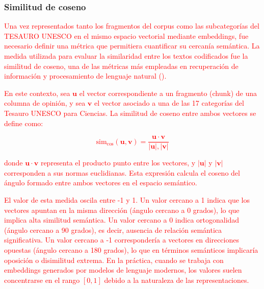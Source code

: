 \documentclass[11pt,a4paper]{article}
\begin{document}
%	
%	
%	
	
	\subsubsection{Similitud de coseno}
	
	\textcolor{red}{Una vez representados tanto los fragmentos del corpus como las subcategorías del TESAURO UNESCO en el mismo espacio vectorial mediante embeddings, fue necesario definir una métrica que permitiera cuantificar su cercanía semántica. La medida utilizada para evaluar la similaridad entre los textos codificados fue la similitud de coseno, una de las métricas más empleadas en recuperación de información y procesamiento de lenguaje natural (\cite{Jurafsky2025}).}
		
		\textcolor{red}{En este contexto, sea $\mathbf{u}$ el vector correspondiente a un fragmento (chunk) de una columna de opinión, y sea $\mathbf{v}$ el vector asociado a una de las 17 categorías del Tesauro UNESCO para Ciencias. La similitud de coseno entre ambos vectores se define como:}
		
	\textcolor{red}{	\begin{equation}
			\text{sim}_{\cos}(\mathbf{u}, \mathbf{v}) =
			\frac{\mathbf{u} \cdot \mathbf{v}}
			{|\mathbf{u}| , |\mathbf{v}|}
		\end{equation}}
		
		\textcolor{red}{donde $\mathbf{u} \cdot \mathbf{v}$ representa el producto punto entre los vectores, y $|\mathbf{u}|$ y $|\mathbf{v}|$ corresponden a sus normas euclidianas. Esta expresión calcula el coseno del ángulo formado entre ambos vectores en el espacio semántico.}
		
		\textcolor{red}{El valor de esta medida oscila entre -1 y 1. Un valor cercano a 1 indica que los vectores apuntan en la misma dirección (ángulo cercano a 0 grados), lo que implica alta similitud semántica. Un valor cercano a 0 indica ortogonalidad (ángulo cercano a 90 grados), es decir, ausencia de relación semántica significativa. Un valor cercano a -1 correspondería a vectores en direcciones opuestas (ángulo cercano a 180 grados), lo que en términos semánticos implicaría oposición o disimilitud extrema. En la práctica, cuando se trabaja con embeddings generados por modelos de lenguaje modernos, los valores suelen concentrarse en el rango $[0,1]$ debido a la naturaleza de las representaciones.}
		
\end{document}
